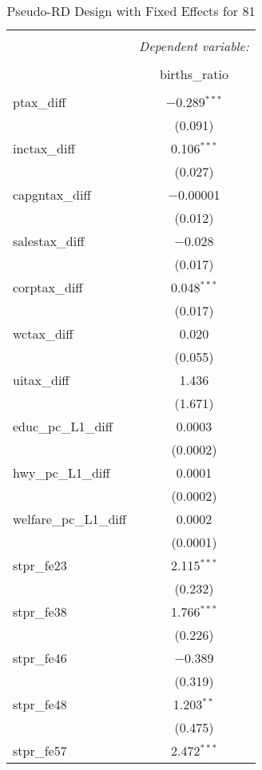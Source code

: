 
\begin{table}[!htbp] \centering 
  \caption{Pseudo-RD Design with Fixed Effects for  81} 
  \label{} 
\begin{tabular}{@{\extracolsep{5pt}}lc} 
\\[-1.8ex]\hline 
\hline \\[-1.8ex] 
 & \multicolumn{1}{c}{\textit{Dependent variable:}} \\ 
\cline{2-2} 
\\[-1.8ex] & births\_ratio \\ 
\hline \\[-1.8ex] 
 ptax\_diff & $-$0.289$^{***}$ \\ 
  & (0.091) \\ 
  inctax\_diff & 0.106$^{***}$ \\ 
  & (0.027) \\ 
  capgntax\_diff & $-$0.00001 \\ 
  & (0.012) \\ 
  salestax\_diff & $-$0.028 \\ 
  & (0.017) \\ 
  corptax\_diff & 0.048$^{***}$ \\ 
  & (0.017) \\ 
  wctax\_diff & 0.020 \\ 
  & (0.055) \\ 
  uitax\_diff & 1.436 \\ 
  & (1.671) \\ 
  educ\_pc\_L1\_diff & 0.0003 \\ 
  & (0.0002) \\ 
  hwy\_pc\_L1\_diff & 0.0001 \\ 
  & (0.0002) \\ 
  welfare\_pc\_L1\_diff & 0.0002 \\ 
  & (0.0001) \\ 
  stpr\_fe23 & 2.115$^{***}$ \\ 
  & (0.232) \\ 
  stpr\_fe38 & 1.766$^{***}$ \\ 
  & (0.226) \\ 
  stpr\_fe46 & $-$0.389 \\ 
  & (0.319) \\ 
  stpr\_fe48 & 1.203$^{**}$ \\ 
  & (0.475) \\ 
  stpr\_fe57 & 2.472$^{***}$ \\ 

\end{tabular}
\end{table}
